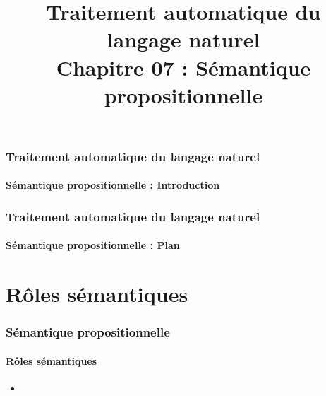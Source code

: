 \documentclass[xcolor=table]{beamer}
\title[TALN : 07- Sémantique propositionnelle]%
{Traitement automatique du langage naturel\\Chapitre 07 : Sémantique propositionnelle}
\begin{document}
	
\begin{frame}
\frametitle{Traitement automatique du langage naturel}
\framesubtitle{Sémantique propositionnelle : Introduction}

%

\end{frame}

%
%

\begin{frame}
\frametitle{Traitement automatique du langage naturel}
\framesubtitle{Sémantique propositionnelle : Plan}

\begin{multicols}{2}
\tableofcontents
\end{multicols}
\end{frame}

\section{Rôles sémantiques}

\begin{frame}
	\frametitle{Sémantique propositionnelle}
	\framesubtitle{Rôles sémantiques}
	
	\begin{itemize}
		\item 
	\end{itemize}
	
\end{frame}
\end{document}
